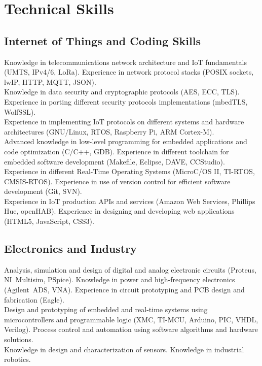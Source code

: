 \documentclass[11pt,a4paper,sans,spanish]{moderncv}
\begin{document}
\section{Technical Skills}


\subsection{Internet of Things and Coding Skills}
Knowledge in telecommunications network architecture and IoT fundamentals (UMTS, IPv4/6, LoRa). Experience in network protocol stacks (POSIX sockets, lwIP, HTTP, MQTT, JSON).
\protect\\[0.4em]
Knowledge in data security and cryptographic protocols (AES, ECC, TLS). Experience in porting different security protocols implementations (mbedTLS, WolfSSL).
\protect\\[0.4em]
Experience in implementing IoT protocols on different systems and hardware architectures (GNU/Linux, RTOS, Raspberry Pi, ARM Cortex-M).
\protect\\[0.4em]
Advanced knowledge in low-level programming for embedded applications and code optimization (C/C++, GDB). Experience in different toolchain for embedded software development (Makefile, Eclipse, DAVE, CCStudio). Experience in different Real-Time Operating Systems (MicroC/OS II, TI-RTOS, CMSIS-RTOS). Experience in use of version control for efficient software development (Git, SVN).
\protect\\[0.4em]
Experience in IoT production APIs and services (Amazon Web Services, Phillips Hue, openHAB). Experience in designing and developing web applications (HTML5, JavaScript, CSS3).


\subsection{Electronics and Industry}
Analysis, simulation and design of digital and analog electronic circuits (Proteus, NI~Multisim, PSpice). Knowledge in power and high-frequency electronics (Agilent~ADS, VNA). Experience in circuit prototyping and PCB design and fabrication (Eagle).
\protect\\[0.4em]
Design and prototyping of embedded and real-time systems using microcontrollers and programmable logic (XMC, TI-MCU, Arduino, PIC, VHDL, Verilog).
Process control and automation using software algorithms and hardware solutions.
\protect\\[0.4em]
Knowledge in design and characterization of sensors. Knowledge in industrial robotics.
\end{document}
